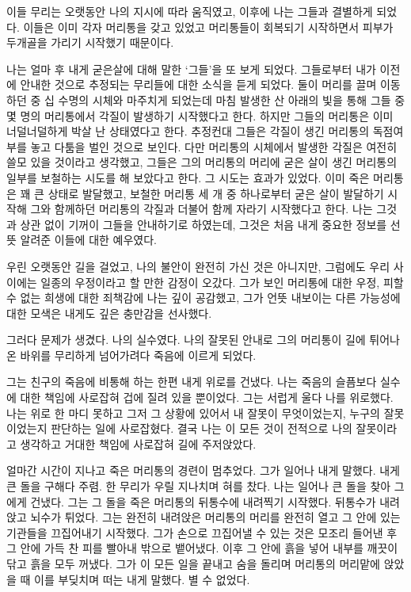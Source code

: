 \begin{article}
이들 무리는 오랫동안 나의 지시에 따라 움직였고, 이후에 나는 그들과 결별하게 되었다. 이들은 이미 각자 머리통을 갖고 있었고 머리통들이 회복되기 시작하면서 피부가 두개골을 가리기 시작했기 때문이다.

나는 얼마 후 내게 굳은살에 대해 말한 `그들'을 또 보게 되었다. 그들로부터 내가 이전에 안내한 것으로 추정되는 무리들에 대한 소식을 듣게 되었다. 둘이 머리를 끌며 이동하던 중 십 수명의 시체와 마주치게 되었는데 마침 발생한 산 아래의 빛을 통해 그들 중 몇 명의 머리통에서 각질이 발생하기 시작했다고 한다. 하지만 그들의 머리통은 이미 너덜너덜하게 박살 난 상태였다고 한다. 추정컨대 그들은 각질이 생긴 머리통의 독점여부를 놓고 다툼을 벌인 것으로 보인다. 다만 머리통의 시체에서 발생한 각질은 여전히 쓸모 있을 것이라고 생각했고, 그들은 그의 머리통의 머리에 굳은 살이 생긴 머리통의 일부를 보철하는 시도를 해 보았다고 한다. 그 시도는 효과가 있었다. 이미 죽은 머리통은 꽤 큰 상태로 발달했고, 보철한 머리통 세 개 중 하나로부터 굳은 살이 발달하기 시작해 그와 함께하던 머리통의 각질과 더불어 함께 자라기 시작했다고 한다. 나는 그것과 상관 없이 기꺼이 그들을 안내하기로 하였는데, 그것은 처음 내게 중요한 정보를 선뜻 알려준 이들에 대한 예우였다.

우린 오랫동안 길을 걸었고, 나의 불안이 완전히 가신 것은 아니지만, 그럼에도 우리 사이에는 일종의 우정이라고 할 만한 감정이 오갔다. 그가 보인 머리통에 대한 우정, 피할 수 없는 희생에 대한 죄책감에 나는 깊이 공감했고, 그가 언뜻 내보이는 다른 가능성에 대한 모색은 내게도 깊은 충만감을 선사했다.

그러다 문제가 생겼다. 나의 실수였다. 나의 잘못된 안내로 그의 머리통이 길에 튀어나온 바위를 무리하게 넘어가려다 죽음에 이르게 되었다.

그는 친구의 죽음에 비통해 하는 한편 내게 위로를 건냈다. 나는 죽음의 슬픔보다 실수에 대한 책임에 사로잡혀 겁에 질려 있을 뿐이었다. 그는 서럽게 울다 나를 위로했다. 나는 위로 한 마디 못하고 그저 그 상황에 있어서 내 잘못이 무엇이었는지, 누구의 잘못이었는지 판단하는 일에 사로잡혔다. 결국 나는 이 모든 것이 전적으로 나의 잘못이라고 생각하고 거대한 책임에 사로잡혀 길에 주저앉았다.

얼마간 시간이 지나고 죽은 머리통의 경련이 멈추었다. 그가 일어나 내게 말했다. 내게 큰 돌을 구해다 주렴. 한 무리가 우릴 지나치며 혀를 찼다. 나는 일어나 큰 돌을 찾아 그에게 건냈다. 그는 그 돌을 죽은 머리통의 뒤통수에 내려찍기 시작했다. 뒤통수가 내려앉고 뇌수가 튀었다. 그는 완전히 내려앉은 머리통의 머리를 완전히 열고 그 안에 있는 기관들을 끄집어내기 시작했다. 그가 손으로 끄집어낼 수 있는 것은 모조리 들어낸 후 그 안에 가득 찬 피를 빨아내 밖으로 뱉어냈다. 이후 그 안에 흙을 넣어 내부를 깨끗이 닦고 흙을 모두 꺼냈다. 그가 이 모든 일을 끝내고 숨을 돌리며 머리통의 머리맡에 앉았을 때 이를 부딪치며 떠는 내게 말했다. 별 수 없었다.


\end{article}
